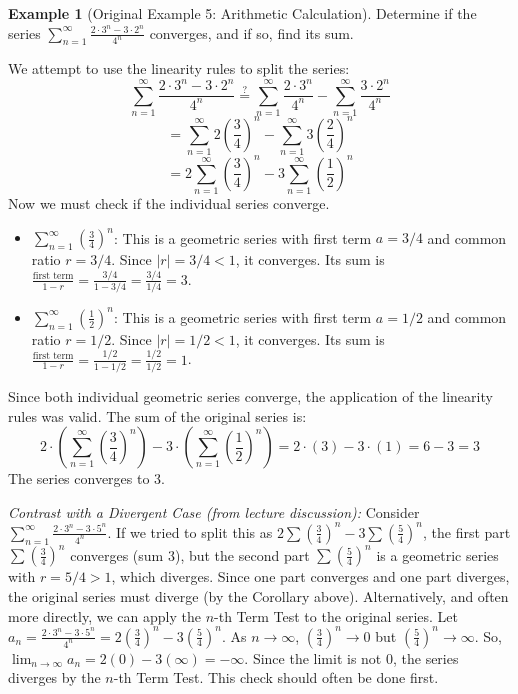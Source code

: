 \documentclass[11pt, letterpaper]{article}
\theoremstyle{plain} %
\theoremstyle{definition} %
\newtheorem{example}[theorem]{Example} %
\theoremstyle{remark} %
\begin{document}
\begin{example}[Original Example 5: Arithmetic Calculation]
Determine if the series $\sum_{n=1}^{\infty} \frac{2 \cdot 3^n - 3 \cdot 2^n}{4^n}$ converges, and if so, find its sum.

We attempt to use the linearity rules to split the series:
\[ \sum_{n=1}^{\infty} \frac{2 \cdot 3^n - 3 \cdot 2^n}{4^n} \overset{?}{=} \sum_{n=1}^{\infty} \frac{2 \cdot 3^n}{4^n} - \sum_{n=1}^{\infty} \frac{3 \cdot 2^n}{4^n} \]
\[ = \sum_{n=1}^{\infty} 2 \left(\frac{3}{4}\right)^n - \sum_{n=1}^{\infty} 3 \left(\frac{2}{4}\right)^n \]
\[ = 2 \sum_{n=1}^{\infty} \left(\frac{3}{4}\right)^n - 3 \sum_{n=1}^{\infty} \left(\frac{1}{2}\right)^n \]
Now we must check if the individual series converge.
\begin{itemize}
    \item $\sum_{n=1}^{\infty} (\frac{3}{4})^n$: This is a geometric series with first term $a=3/4$ and common ratio $r = 3/4$. Since $|r|=3/4 < 1$, it converges. Its sum is $\frac{\text{first term}}{1-r} = \frac{3/4}{1-3/4} = \frac{3/4}{1/4} = 3$.
    \item $\sum_{n=1}^{\infty} (\frac{1}{2})^n$: This is a geometric series with first term $a=1/2$ and common ratio $r = 1/2$. Since $|r|=1/2 < 1$, it converges. Its sum is $\frac{\text{first term}}{1-r} = \frac{1/2}{1-1/2} = \frac{1/2}{1/2} = 1$.
\end{itemize}
Since both individual geometric series converge, the application of the linearity rules was valid. The sum of the original series is:
\[ 2 \cdot \left( \sum_{n=1}^{\infty} \left(\frac{3}{4}\right)^n \right) - 3 \cdot \left( \sum_{n=1}^{\infty} \left(\frac{1}{2}\right)^n \right) = 2 \cdot (3) - 3 \cdot (1) = 6 - 3 = 3 \]
The series converges to 3.

\textit{Contrast with a Divergent Case (from lecture discussion):}
Consider $\sum_{n=1}^{\infty} \frac{2 \cdot 3^n - 3 \cdot 5^n}{4^n}$.
If we tried to split this as $2 \sum (\frac{3}{4})^n - 3 \sum (\frac{5}{4})^n$, the first part $\sum (\frac{3}{4})^n$ converges (sum 3), but the second part $\sum (\frac{5}{4})^n$ is a geometric series with $r=5/4 > 1$, which diverges. Since one part converges and one part diverges, the original series must diverge (by the Corollary above).
Alternatively, and often more directly, we can apply the $n$-th Term Test to the original series. Let $a_n = \frac{2 \cdot 3^n - 3 \cdot 5^n}{4^n} = 2(\frac{3}{4})^n - 3(\frac{5}{4})^n$.
As $n \to \infty$, $(\frac{3}{4})^n \to 0$ but $(\frac{5}{4})^n \to \infty$.
So, $\lim_{n \to \infty} a_n = 2(0) - 3(\infty) = -\infty$. Since the limit is not 0, the series diverges by the $n$-th Term Test. This check should often be done first.
\end{example}
\end{document}
